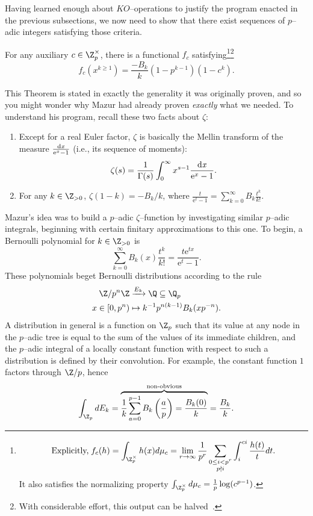 Having learned enough about $KO$--operations to justify the program enacted in the previous subsections, we now need to show that there exist sequences of $p$--adic integers satisfying those criteria.

\begin{theorem}[Mazur]
For any auxiliary $c \in \Z_p^\times$, there is a functional $f_c$ satisfying\footnote{\[\text{Explicitly,\;} f_c(h) = \int_{\Z_p^\times} h(x) d\mu_c = \lim_{r \to \infty} \frac{1}{p^r} \sum_{\substack{0 \le i < p^r \\ p \nmid i}} \int_i^{ci} \frac{h(t)}{t} dt.\]  It also satisfies the normalizing property $\int_{\Z_p^\times} d\mu_c = \frac{1}{p} \log(c^{p-1})$.}\footnote{With considerable effort, this output can be halved~\cite[Section 10.3]{AHR}.} \[f_c(x^{k \ge 1}) = \frac{-B_k}{k}(1 - p^{k-1})(1 - c^k).\]
\end{theorem}

\noindent This Theorem is stated in exactly the generality it was originally proven, and so you might wonder why Mazur had already proven \emph{exactly} what we needed.  To understand his program, recall these two facts about $\zeta$:
\begin{enumerate}
    \item Except for a real Euler factor, $\zeta$ is basically the Mellin transform of the measure $\frac{\operatorname{d\mathit{x}}}{\mathrm e^x - 1}$ (i.e., its sequence of moments): \[\zeta(s) = \frac{1}{\Gamma(s)} \int_0^\infty x^{s-1} \frac{\operatorname{d\mathit{x}}}{\mathrm e^x - 1}.\]
    \item For any $k \in \Z_{> 0}$, $\zeta(1 - k) = -B_k / k$, where $\frac{t}{\mathrm e^t - 1} = \sum_{k=0}^\infty B_k \frac{t^k}{k!}$.
\end{enumerate}
Mazur's idea was to build a  $p$--adic $\zeta$--function by investigating similar $p$--adic integrals, beginning with certain finitary approximations to this one.  To begin, a Bernoulli polynomial for $k \in \Z_{>0}$ is \[\sum_{k=0}^\infty B_k(x) \frac{t^k}{k!} = \frac{t \mathrm e^{tx}}{\mathrm e^t - 1}.\]  These polynomials beget Bernoulli distributions according to the rule
\begin{align*}
\Z/p^n\Z & \xrightarrow{E_k} \Q \subseteq \Q_p \\
x \in [0, p^n) & \mapsto k^{-1} p^{n(k-1)} B_k(x p^{-n}).
\end{align*}
A distribution in general is a function on $\Z_p$ such that its value at any node in the $p$--adic tree is equal to the sum of the values of its immediate children, and the $p$--adic integral of a locally constant function with respect to such a distribution is defined by their convolution.  For example, the constant function $1$ factors through $\Z/p$, hence \[\int_{\Z_p} dE_k = \overset{\text{non-obvious}}{\overbrace{\frac{1}{k} \sum_{a=0}^{p-1} B_k\left(\frac{a}{p}\right) = \frac{B_k(0)}{k}}} = \frac{B_k}{k}.\]

